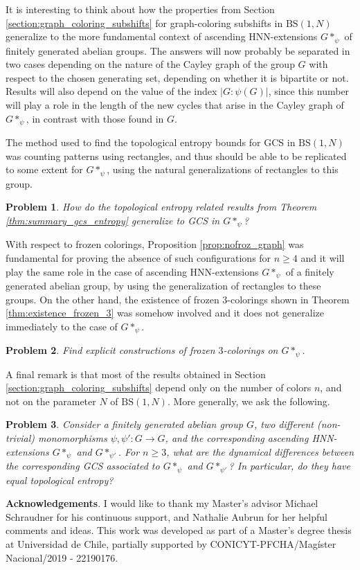 \documentclass[letterpaper,11pt,reqno]{amsart}
\theoremstyle{plain}
\newtheorem*{problem*}{Problem}
\theoremstyle{definition}
\theoremstyle{cupremark}
\newcommand{\BS}[1][N]{\mathrm{BS}(1,#1)}
\begin{document}
It is interesting to think about how the properties from Section \ref{section:graph_coloring_subshifts} for graph-coloring subshifts in $\BS$ generalize to the more fundamental context of ascending HNN-extensions $G*_{\psi}$ of finitely generated abelian groups. The answers will now probably be separated in two cases depending on the nature of the Cayley graph of the group $G$ with respect to the chosen generating set, depending on whether it is bipartite or not. Results will also depend on the value of the index $|G:\psi(G)|$, since this number will play a role in the length of the new cycles that arise in the Cayley graph of $G*_{\psi}$, in contrast with those found in $G$.

The method used to find the topological entropy bounds for GCS in $\BS$ was counting patterns using rectangles, and thus should be able to be replicated to some extent for $G*_{\psi}$, using the natural generalizations of rectangles to this group. 
\begin{problem*}
	How do the topological entropy related results from Theorem \ref{thm:summary_gcs_entropy} generalize to GCS in $G*_{\psi}$?
\end{problem*}
With respect to frozen colorings, Proposition \ref{prop:nofroz_graph} was fundamental for proving the absence of such configurations for $n\ge 4$ and it will play the same role in the case of ascending HNN-extensions $G*_{\psi}$ of a finitely generated abelian group, by using the generalization of rectangles to these groups. On the other hand, the existence of frozen $3$-colorings shown in Theorem \ref{thm:existence_frozen_3} was somehow involved and it does not generalize immediately to the case of $G*_{\psi}$.
\begin{problem*}
	Find explicit constructions of frozen $3$-colorings on $G*_{\psi}$.
\end{problem*}

A final remark is that most of the results obtained in Section \ref{section:graph_coloring_subshifts} depend only on the number of colors $n$, and not on the parameter $N$ of $\BS$. More generally, we ask the following.
\begin{problem*}
	Consider a finitely generated abelian group $G$, two different (non-trivial) monomorphisms $\psi, \psi':G\to G$, and the corresponding ascending HNN-extensions $G*_{\psi}$ and $G*_{\psi'}$. For $n\ge 3$, what are the dynamical differences between the corresponding GCS associated to $G*_{\psi}$ and $G*_{\psi'}$? In particular, do they have equal topological entropy?
\end{problem*}


	\textbf{Acknowledgements}. I would like to thank my Master's advisor Michael Schraudner for his continuous support, and Nathalie Aubrun for her helpful comments and ideas. This work was developed as part of a Master's degree thesis at Universidad de Chile, partially supported by CONICYT-PFCHA/Mag\'ister Nacional/2019 - 22190176.
	

{}
\end{document}
